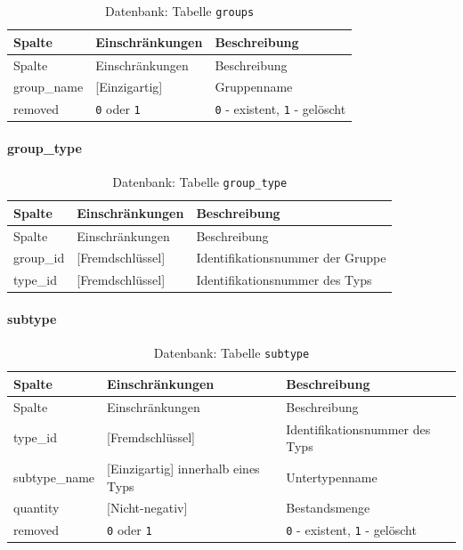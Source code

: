 \documentclass[
]{article}
\begin{document}
\begin{longtable}[]{@{}lll@{}}
\caption{\label{tab:groups} Datenbank: Tabelle \texttt{groups}}\tabularnewline
\toprule
Spalte & Einschränkungen & Beschreibung \\
\midrule
\endfirsthead
\toprule
Spalte & Einschränkungen & Beschreibung \\
\midrule
\endhead
group\_name & {[}Einzigartig{]} & Gruppenname \\
removed & \texttt{0} oder \texttt{1} & \texttt{0} - existent, \texttt{1} - gelöscht \\
\bottomrule
\end{longtable}

\hypertarget{group_type}{%
\paragraph{group\_type}\label{group_type}}

\begin{longtable}[]{@{}lll@{}}
\caption{\label{tab:group-type} Datenbank: Tabelle \texttt{group\_type}}\tabularnewline
\toprule
Spalte & Einschränkungen & Beschreibung \\
\midrule
\endfirsthead
\toprule
Spalte & Einschränkungen & Beschreibung \\
\midrule
\endhead
group\_id & {[}Fremdschlüssel{]} & Identifikationsnummer der Gruppe \\
type\_id & {[}Fremdschlüssel{]} & Identifikationsnummer des Typs \\
\bottomrule
\end{longtable}

\hypertarget{subtype}{%
\paragraph{subtype}\label{subtype}}

\begin{longtable}[]{@{}lll@{}}
\caption{\label{tab:subtype} Datenbank: Tabelle \texttt{subtype}}\tabularnewline
\toprule
Spalte & Einschränkungen & Beschreibung \\
\midrule
\endfirsthead
\toprule
Spalte & Einschränkungen & Beschreibung \\
\midrule
\endhead
type\_id & {[}Fremdschlüssel{]} & Identifikationsnummer des Typs \\
subtype\_name & {[}Einzigartig{]} innerhalb eines Typs & Untertypenname \\
quantity & {[}Nicht-negativ{]} & Bestandsmenge \\
removed & \texttt{0} oder \texttt{1} & \texttt{0} - existent, \texttt{1} - gelöscht \\
\bottomrule
\end{longtable}
\end{document}
